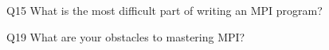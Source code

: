 \begin{description}%
\item{Q15} What is the most difficult part of writing an MPI program?%
\item{Q19} What are your obstacles to mastering MPI?%
\end{description}%
